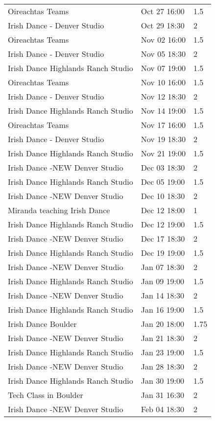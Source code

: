 \documentclass[a4paper]{article}
\begin{document}
\begin{longtable}{lll}
Oireachtas Teams & Oct 27 16:00 & 1.5 \\
Irish Dance - Denver Studio & Oct 29 18:30 & 2 \\
Oireachtas Teams & Nov 02 16:00 & 1.5 \\
Irish Dance - Denver Studio & Nov 05 18:30 & 2 \\
Irish Dance Highlands Ranch Studio & Nov 07 19:00 & 1.5 \\
Oireachtas Teams & Nov 10 16:00 & 1.5 \\
Irish Dance - Denver Studio & Nov 12 18:30 & 2 \\
Irish Dance Highlands Ranch Studio & Nov 14 19:00 & 1.5 \\
Oireachtas Teams & Nov 17 16:00 & 1.5 \\
Irish Dance - Denver Studio & Nov 19 18:30 & 2 \\
Irish Dance Highlands Ranch Studio & Nov 21 19:00 & 1.5 \\
Irish Dance -NEW Denver Studio & Dec 03 18:30 & 2 \\
Irish Dance Highlands Ranch Studio & Dec 05 19:00 & 1.5 \\
Irish Dance -NEW Denver Studio & Dec 10 18:30 & 2 \\
Miranda teaching Irish Dance & Dec 12 18:00 & 1 \\
Irish Dance Highlands Ranch Studio & Dec 12 19:00 & 1.5 \\
Irish Dance -NEW Denver Studio & Dec 17 18:30 & 2 \\
Irish Dance Highlands Ranch Studio & Dec 19 19:00 & 1.5 \\
Irish Dance -NEW Denver Studio & Jan 07 18:30 & 2 \\
Irish Dance Highlands Ranch Studio & Jan 09 19:00 & 1.5 \\
Irish Dance -NEW Denver Studio & Jan 14 18:30 & 2 \\
Irish Dance Highlands Ranch Studio & Jan 16 19:00 & 1.5 \\
Irish Dance  Boulder & Jan 20 18:00 & 1.75 \\
Irish Dance -NEW Denver Studio & Jan 21 18:30 & 2 \\
Irish Dance Highlands Ranch Studio & Jan 23 19:00 & 1.5 \\
Irish Dance -NEW Denver Studio & Jan 28 18:30 & 2 \\
Irish Dance Highlands Ranch Studio & Jan 30 19:00 & 1.5 \\
Tech Class in Boulder & Jan 31 16:30 & 2 \\
Irish Dance -NEW Denver Studio & Feb 04 18:30 & 2 \\

\end{longtable}
\end{document}

